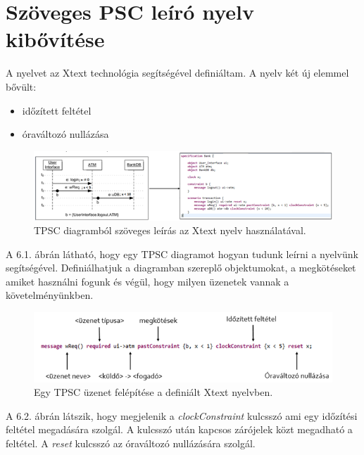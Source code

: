 \chapter{Szöveges PSC leíró nyelv kibővítése}

A nyelvet az Xtext technológia segítségével definiáltam.
A nyelv két új elemmel bővült:

\begin{itemize}
    \item időzített feltétel
    \item óraváltozó nullázása
\end{itemize}

\begin{figure}[!ht]
    \centering
    \includegraphics[width=150mm, keepaspectratio]{figures/11abra.png}
    \caption{TPSC diagramból szöveges leírás az Xtext nyelv használatával.}
\end{figure}

A 6.1. ábrán látható, hogy egy TPSC diagramot hogyan tudunk leírni a nyelvünk segítségével.
Definiálhatjuk a diagramban szereplő objektumokat, a megkötéseket amiket használni fogunk és végül, hogy milyen üzenetek vannak a követelményünkben.

\begin{figure}[!ht]
    \centering
    \includegraphics[width=150mm, keepaspectratio]{figures/12abra.png}
    \caption{Egy TPSC üzenet felépítése a definiált Xtext nyelvben.}
\end{figure}

A 6.2. ábrán látszik, hogy megjelenik a \textit{clockConstraint} kulcsszó ami egy időzítési feltétel megadására szolgál.
A kulcsszó után kapcsos zárójelek közt megadható a feltétel.
A \textit{reset} kulcsszó az óraváltozó nullázására szolgál.